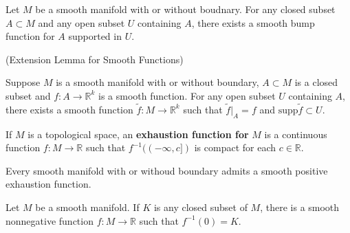 \begin{proposition}
    Let $M$ be a smooth manifold with or without boudnary. For any closed subset $A\subset M$ and any open subset $U$ containing $A$, there exists a smooth bump function for $A$ supported in $U$.
\end{proposition}

\begin{lemma}(Extension Lemma for Smooth Functions)\par
    Suppose $M$ is a smooth manifold with or without boundary, $A\subset M$ is a closed subset and $f:A\to \mathbb{R}^k$ is a smooth function. For any open subset $U$ containing $A$, there exists a smooth function $\tilde{f}:M\to\mathbb{R}^k$ such that $\tilde{f}|_A = f$ and $\text{supp}\tilde{f} \subset U$.
\end{lemma}

\begin{definition}
    If $M$ is a topological space, an \textbf{exhaustion function for }$M$ is a continuous function $f:M\to\mathbb{R}$ such that $f^{-1}((-\infty,c])$ is compact for each $c\in\mathbb{R}$.
\end{definition}

\begin{proposition}
    Every smooth manifold with or withoud boundary admits a smooth positive exhaustion function.
\end{proposition}

\begin{theorem}
    Let $M$ be a smooth manifold. If $K$ is any closed subset of $M$, there is a smooth nonnegative function $f:M\to\mathbb{R}$ such that $f^{-1}(0) = K$.
\end{theorem}